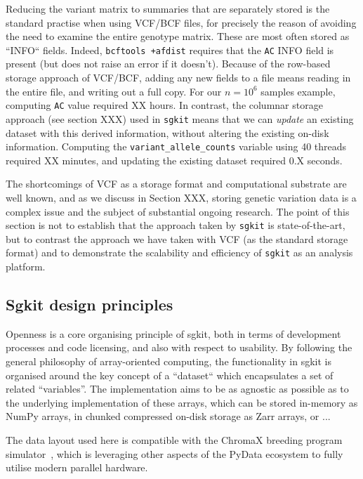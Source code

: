 \documentclass[9pt,lineno]{elife}
\newcommand{\toolname}[1]{\texttt{#1}}
\begin{document}
Reducing the variant matrix to summaries that are separately stored
is the standard practise when using VCF/BCF files, for precisely the
reason of avoiding the need to examine the entire genotype matrix.
These are most often stored as ``INFO`` fields.
Indeed, \toolname{bcftools +afdist} requires that the \texttt{AC}
INFO field is present (but does not raise an error
if it doesn't). Because of the row-based storage approach of
VCF/BCF, adding any new fields to a file means reading in the entire
file, and writing out a full copy. For our $n=10^6$ samples example,
computing \texttt{AC} value required XX hours.
In contrast, the columnar storage approach (see section XXX) used
in \toolname{sgkit} means that we can \emph{update} an existing
dataset with this derived information, without altering the existing
on-disk information.
Computing the
\texttt{variant\_allele\_counts} variable using
40 threads  required XX minutes, and updating the existing dataset required
0.X seconds.

The shortcomings of VCF as a storage format and computational
substrate are well known, and as we discuss in Section XXX,
storing genetic variation data is a complex issue
and the subject of substantial ongoing research. The point of this
section is not to establish that the approach taken by \toolname{sgkit}
is state-of-the-art, but to contrast the approach we have taken
with VCF (as the standard storage format) and to demonstrate
the scalability and efficiency of \toolname{sgkit} as an analysis
platform.


\subsection{Sgkit design principles}

Openness is a core organising principle of sgkit, both in terms of
development processes and code licensing, and also with respect
to usability. By following the general philosophy of array-oriented
computing, the functionality in sgkit is organised around the
key concept of a ``dataset`` which encapsulates a set of
related ``variables''. The implementation aims to be as agnostic
as possible as to the underlying implementation of these arrays,
which can be stored in-memory as NumPy arrays, in chunked
compressed on-disk storage as Zarr arrays, or ...

The data layout used here is compatible with the ChromaX
breeding program simulator~\citep{younis2023chromax}, which
is leveraging other aspects of the PyData ecosystem to
fully utilise modern parallel hardware.
\end{document}
